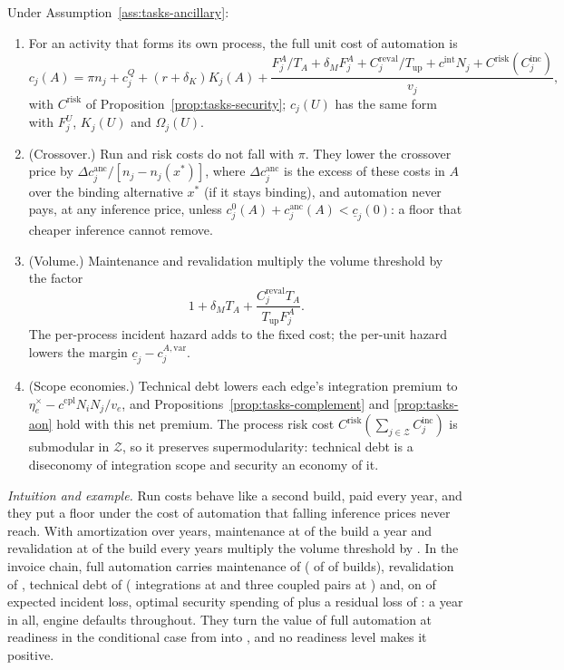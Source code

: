 \begin{proposition}\label{prop:tasks-fullcost}
Under Assumption~\ref{ass:tasks-ancillary}:
\begin{enumerate}
\item[(a)] For an activity that forms its own process, the full unit cost of automation is
\begin{equation}\label{eq:tasks-fullcost}
c_j(A)=\pi n_j+c^Q_j+(r+\delta_K)K_j(A)+\frac{F^A_j/T_A+\delta_MF^A_j+C^{\mathrm{reval}}_j/T_{\mathrm{up}}+c^{\mathrm{int}}N_j+C^{\mathrm{risk}}(C^{\mathrm{inc}}_j)}{v_j},
\end{equation}
with $C^{\mathrm{risk}}$ of Proposition~\ref{prop:tasks-security}; $c_j(U)$ has the same form with $F^U_j$, $K_j(U)$ and $\Omega_j(U)$.
\item[(b)] (Crossover.) Run and risk costs do not fall with $\pi$. They lower the crossover price by $\Delta c^{\mathrm{anc}}_j/[n_j-n_j(x^*)]$, where $\Delta c^{\mathrm{anc}}_j$ is the excess of these costs in $A$ over the binding alternative $x^*$ (if it stays binding), and automation never pays, at any inference price, unless $c^0_j(A)+c^{\mathrm{anc}}_j(A)<\underline c_j(0)$: a floor that cheaper inference cannot remove.
\item[(c)] (Volume.) Maintenance and revalidation multiply the volume threshold by the factor
\[
1+\delta_MT_A+\frac{C^{\mathrm{reval}}_jT_A}{T_{\mathrm{up}}F^A_j}.
\] The per-process incident hazard adds to the fixed cost; the per-unit hazard lowers the margin $\underline c_j-c^{A,\mathrm{var}}_j$.
\item[(d)] (Scope economies.) Technical debt lowers each edge's integration premium to $\eta^\times_e-c^{\mathrm{cpl}}N_iN_j/v_e$, and Propositions~\ref{prop:tasks-complement} and \ref{prop:tasks-aon} hold with this net premium. The process risk cost $C^{\mathrm{risk}}(\sum_{j\in\mathcal Z}C^{\mathrm{inc}}_j)$ is submodular in $\mathcal Z$, so it preserves supermodularity: technical debt is a diseconomy of integration scope and security an economy of it.
\end{enumerate}
\end{proposition}

\noindent\emph{Intuition and example.} Run costs behave like a second build, paid every year, and they put a floor under the cost of automation that falling inference prices never reach. With amortization over \icTA{} years, maintenance at \icDeltaM{} of the build a year and revalidation at \icRevalShare{} of the build every \icTup{} years multiply the volume threshold by \icVolFactor. In the invoice chain, full automation carries maintenance of \icMaint{} (\icDeltaM{} of \icFbuild{} of builds), revalidation of \icReval, technical debt of \icTechDebt{} (\icNint{} integrations at \icCint{} and three coupled pairs at \icCcpl) and, on \icCinc{} of expected incident loss, optimal security spending of \icSecSpend{} plus a residual loss of \icSecResid: \icRunTotal{} a year in all, engine defaults throughout. They turn the value of full automation at readiness \icIotaHigh{} in the conditional case from \icWfullHigh{} into \icWrunHigh, and no readiness level makes it positive.

